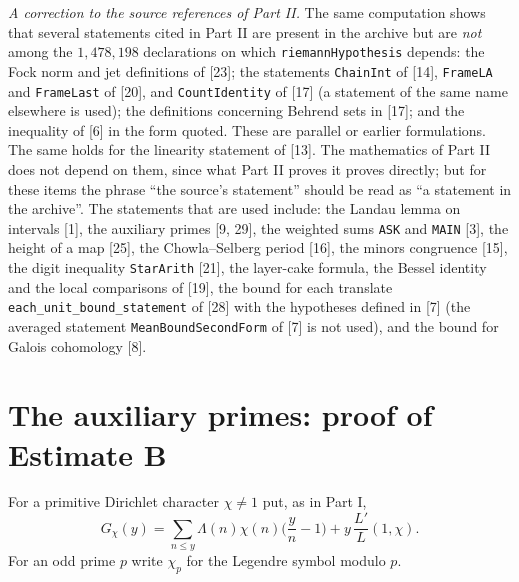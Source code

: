 \documentclass[11pt,letterpaper]{article}
\begin{document}
\emph{A correction to the source references of Part II.} The same computation shows that several
statements cited in Part II are present in the archive but are \emph{not} among the $1{,}478{,}198$
declarations on which \texttt{riemannHypothesis} depends: the Fock norm and jet definitions of [23]; the
statements \texttt{ChainInt} of [14], \texttt{FrameLA} and \texttt{FrameLast} of [20], and
\texttt{CountIdentity} of [17] (a statement of the same name elsewhere is used); the definitions concerning
Behrend sets in [17]; and the inequality of [6] in the form quoted. These are
parallel or earlier formulations. The same holds for the linearity statement of [13]. The mathematics of Part II does not depend on them, since what Part II
proves it proves directly; but for these items the phrase ``the source's statement'' should be read as ``a
statement in the archive''. The statements that are used include: the Landau lemma on intervals [1], the
auxiliary primes [9, 29], the weighted sums \texttt{ASK} and \texttt{MAIN} [3], the height of a map [25], the
Chowla--Selberg period [16], the minors congruence [15], the digit inequality \texttt{StarArith} [21], the
layer-cake formula, the Bessel identity and the local comparisons of [19], the bound for each translate
\texttt{each\_unit\_bound\_statement} of [28] with the hypotheses defined in [7] (the averaged statement
\texttt{MeanBoundSecondForm} of [7] is not used), and the bound for Galois cohomology [8].

\section{The auxiliary primes: proof of Estimate B}

For a primitive Dirichlet character $\chi\ne1$ put, as in Part I,
\begin{equation}\label{D:111}
 G_\chi(y)=\sum_{n\le y}\Lambda(n)\chi(n)\Big(\frac yn-1\Big)+y\,\frac{L'}{L}(1,\chi).
\end{equation}
For an odd prime $p$ write $\chi_p$ for the Legendre symbol modulo $p$.
\end{document}
